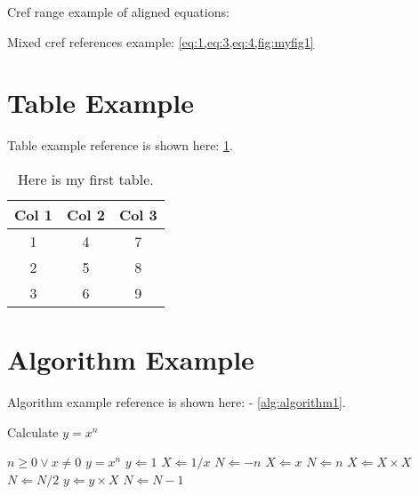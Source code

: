 \documentclass[12pt,oneside]{book}
\begin{document}
\noindent Cref range example of aligned equations: 
 
\noindent Mixed cref references example: \cref{eq:1,eq:3,eq:4,fig:myfig1}

\newpage
\section{Table Example}

\noindent Table example reference is shown here: \cref{tab:mytable}.

\begin{table}[h!]
  \centering
  \begin{tabular}{ccc}
  \hline
  \textbf{Col 1} & \textbf{Col 2} & \textbf{Col 3} \\ \hline
  1              & 4              & 7              \\ \hline
  2              & 5              & 8              \\ \hline
  3              & 6              & 9              \\ \hline
  \end{tabular}
  \caption{Here is my first table.}
  \label{tab:mytable}
\end{table}

\newpage
\section{Algorithm Example}

\noindent Algorithm example reference is shown here: - \cref{alg:algorithm1}. 

\begin{algorithm} %
  \caption{Calculate $y = x^n$} %
  \label{alg:algorithm1} %
  \begin{algorithmic} %
      \REQUIRE $n \geq 0 \vee x \neq 0$
      \ENSURE $y = x^n$
      \STATE $y \Leftarrow 1$
          \STATE $X \Leftarrow 1 / x$
          \STATE $N \Leftarrow -n$
      \ELSE
          \STATE $X \Leftarrow x$
          \STATE $N \Leftarrow n$
      \ENDIF
              \STATE $X \Leftarrow X \times X$
              \STATE $N \Leftarrow N / 2$
          \ELSE[$N$ is odd]
              \STATE $y \Leftarrow y \times X$
              \STATE $N \Leftarrow N - 1$
          \ENDIF
      \ENDWHILE
  \end{algorithmic}
\end{algorithm}
\end{document}
